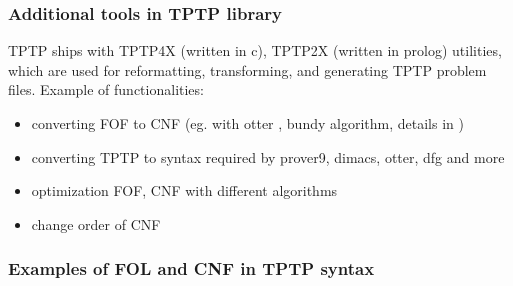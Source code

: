 
\subsubsection{Additional tools in TPTP library}

TPTP ships with \gls{TPTP4X} (written in c), \gls{TPTP2X} (written in prolog) utilities, which are used for reformatting, transforming, and generating TPTP problem files. Example of functionalities:

\begin{itemize}
  \item converting \gls{FOF} to \gls{CNF} (eg. with otter \cite{McC-Otter-URL}, bundy \cite{Bun83} algorithm, details in \cite{SM96})
  \item converting TPTP to syntax required by prover9, dimacs, otter, dfg and more
  \item optimization \gls{FOF}, \gls{CNF} with different algorithms
  \item change order of \gls{CNF}
\end{itemize}

\subsubsection{Examples of FOL and CNF in TPTP syntax}

